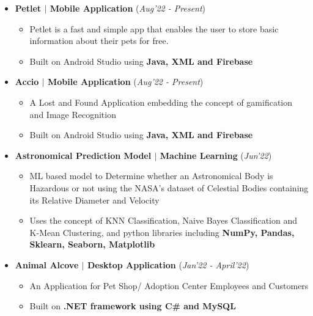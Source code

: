 \documentclass[11pt]{extarticle}
\begin{document}
\begin{itemize}


\item \textbf{Petlet $|$ Mobile Application} \href{https://github.com/MiitaliGupta/Petlet}{\faGithubSquare}\hfill\hfill(\textit{Aug'22 - Present})
\begin{itemize}
\item Petlet is a fast and simple app that enables the user to store basic information about their pets for free.
\item Built on Android Studio using \textbf{Java, XML and Firebase}
\medskip
\end{itemize}


\item \textbf{Accio $|$ Mobile Application} \href{https://github.com/MiitaliGupta/Accio}{\faGithubSquare}\hfill\hfill(\textit{Aug'22 - Present})
\begin{itemize}
\item A Lost and Found Application embedding the concept of gamification and Image Recognition
\item Built on Android Studio using \textbf{Java, XML and Firebase}
\medskip
\end{itemize}

\item \textbf{Astronomical Prediction Model $|$ Machine Learning}
\href{https://bit.ly/KNN_graphs}{\faGithubSquare}
\href{https://bit.ly/NaiveBayes_new}{\faGithubSquare}
\href{https://bit.ly/KMeanClustering}{\faGithubSquare}\hfill\hfill(\textit{Jun'22})

\begin{itemize}
\item ML based model to Determine whether an Astronomical Body is Hazardous or not using the NASA's dataset of Celestial Bodies containing its Relative Diameter and Velocity
\item Uses the concept of KNN Classification, Naive Bayes Classification and K-Mean Clustering, and python libraries including \textbf{NumPy, Pandas, Sklearn, Seaborn, Matplotlib}
\medskip
\end{itemize}


\item \textbf{Animal Alcove $|$ Desktop Application} \href{https://github.com/MiitaliGupta/AnimalAlcove}{\faGithubSquare}\hfill\hfill(\textit{Jan'22 - April'22})
\begin{itemize}
\item An Application for Pet Shop/ Adoption Center Employees and Customers 
\item Built on \textbf{.NET framework using C\# and MySQL}
\medskip
\end{itemize}



\end{itemize}
\end{document}
